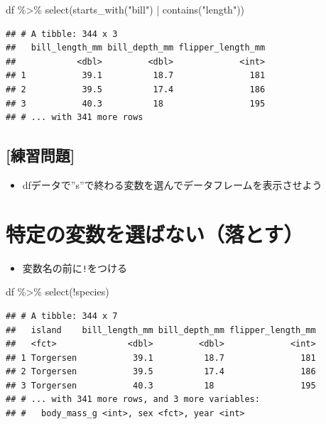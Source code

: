 \documentclass[
  xelatex,ja=standard, b5paper]{bxjsbook}
\newenvironment{Shaded}{\begin{snugshade}}{\end{snugshade}}
\newcommand{\FunctionTok}[1]{\textcolor[rgb]{0.00,0.00,0.00}{#1}}
\newcommand{\NormalTok}[1]{#1}
\newcommand{\SpecialCharTok}[1]{\textcolor[rgb]{0.00,0.00,0.00}{#1}}
\newcommand{\StringTok}[1]{\textcolor[rgb]{0.31,0.60,0.02}{#1}}
\providecommand{\tightlist}{%
  \setlength{\itemsep}{0pt}\setlength{\parskip}{0pt}}
\begin{document}
\begin{Shaded}
\begin{Highlighting}[]
\NormalTok{df }\SpecialCharTok{\%\textgreater{}\%}
  \FunctionTok{select}\NormalTok{(}\FunctionTok{starts\_with}\NormalTok{(}\StringTok{"bill"}\NormalTok{) }\SpecialCharTok{|} \FunctionTok{contains}\NormalTok{(}\StringTok{"length"}\NormalTok{))}
\end{Highlighting}
\end{Shaded}

\begin{verbatim}
## # A tibble: 344 x 3
##   bill_length_mm bill_depth_mm flipper_length_mm
##            <dbl>         <dbl>             <int>
## 1           39.1          18.7               181
## 2           39.5          17.4               186
## 3           40.3          18                 195
## # ... with 341 more rows
\end{verbatim}

\hypertarget{ux7df4ux7fd2ux554fux984c-1}{%
\subsection{{[}練習問題{]}}\label{ux7df4ux7fd2ux554fux984c-1}}

\begin{itemize}
\tightlist
\item
  dfデータで''s''で終わる変数を選んでデータフレームを表示させよう
\end{itemize}

\hypertarget{select-drop}{%
\section{特定の変数を選ばない（落とす）}\label{select-drop}}

\begin{itemize}
\tightlist
\item
  変数名の前に\texttt{!}をつける
\end{itemize}

\begin{Shaded}
\begin{Highlighting}[]
\NormalTok{df }\SpecialCharTok{\%\textgreater{}\%} 
  \FunctionTok{select}\NormalTok{(}\SpecialCharTok{!}\NormalTok{species)}
\end{Highlighting}
\end{Shaded}

\begin{verbatim}
## # A tibble: 344 x 7
##   island    bill_length_mm bill_depth_mm flipper_length_mm
##   <fct>              <dbl>         <dbl>             <int>
## 1 Torgersen           39.1          18.7               181
## 2 Torgersen           39.5          17.4               186
## 3 Torgersen           40.3          18                 195
## # ... with 341 more rows, and 3 more variables:
## #   body_mass_g <int>, sex <fct>, year <int>
\end{verbatim}
\end{document}
